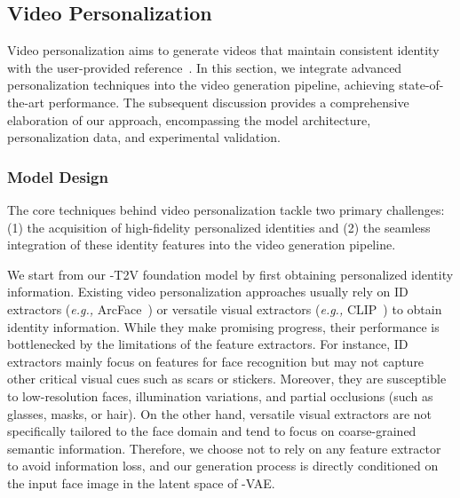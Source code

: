 \subsection{Video Personalization}
\label{sec:video_personalization}

Video personalization aims to generate videos that maintain consistent identity with the user-provided reference~\citep{dreamvideo, li2024personalvideo, consisid}.
In this section, we integrate advanced personalization techniques into the video generation pipeline, achieving state-of-the-art performance.
The subsequent discussion provides a comprehensive elaboration of our approach, encompassing the model architecture, personalization data, and experimental validation.


\subsubsection{Model Design}

The core techniques behind video personalization tackle two primary challenges: (1) the acquisition of high-fidelity personalized identities and (2) the seamless integration of these identity features into the video generation pipeline.

We start from our \method-T2V foundation model by first obtaining personalized identity information. 
Existing video personalization approaches usually rely on ID extractors (\textit{e.g.,} ArcFace~\citep{deng2019arcface}) or versatile visual extractors (\textit{e.g.,} CLIP~\citep{radford2021learning}) to obtain identity information.
While they make promising progress, their performance is bottlenecked by the limitations of the feature extractors. 
For instance, ID extractors mainly focus on features for face recognition but may not capture other critical visual cues such as scars or stickers. 
Moreover, they are susceptible to low-resolution faces, illumination variations, and partial occlusions (such as glasses, masks, or hair). 
On the other hand, versatile visual extractors are not specifically tailored to the face domain and tend to focus on coarse-grained semantic information. 
Therefore, we choose not to rely on any feature extractor to avoid information loss, and our generation process is directly conditioned on the input face image in the latent space of \method-VAE.

